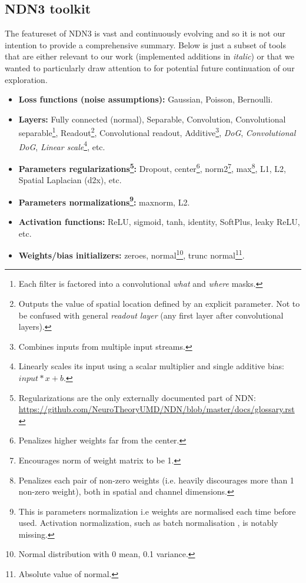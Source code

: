 \subsection{NDN3 toolkit}\label{ch:3.1.1}

The featureset of NDN3 is vast and continuously evolving and so it is not our intention to provide a comprehensive summary. Below is just a subset of tools that are either relevant to our work (implemented additions in \textit{italic}) or that we wanted to particularly draw attention to for potential future continuation of our exploration.

\begin{itemize}
    \item \textbf{Loss functions (noise assumptions):} Gaussian, Poisson, Bernoulli.
    
    \item \textbf{Layers:} Fully connected (normal), Separable, Convolution, Convolutional separable\footnote{Each filter is factored into a convolutional \textit{what} and \textit{where} masks.}, Readout\footnote{Outputs the value of spatial location defined by an explicit parameter. Not to be confused with general \textit{readout layer} (any first layer after convolutional layers).}, Convolutional readout, Additive\footnote{Combines inputs from multiple input streams.}, \textit{DoG}, \textit{Convolutional DoG}, \textit{Linear scale}\footnote{Linearly scales its input using a scalar multiplier and single additive bias: $input*x + b$.}, etc.
    
    \item \textbf{Parameters regularizations\footnote{Regularizations are the only externally documented part of NDN: \href{https://github.com/NeuroTheoryUMD/NDN/blob/master/docs/glossary.rst}{https://github.com{\-}/NeuroTheoryUMD/NDN/blob/master/docs/glossary.rst}}:} Dropout, center\footnote{Penalizes higher weights far from the center.}, norm2\footnote{Encourages norm of weight matrix to be 1.}, max\footnote{Penalizes each pair of non-zero weights (i.e. heavily discourages more than 1 non-zero weight), both in spatial and channel dimensions.}, L1, L2, Spatial Laplacian (d2x), etc.
    
    \item \textbf{Parameters normalizations\footnote{This is parameters normalization i.e weights are normalised each time before used. Activation normalization, such as batch normalisation \citep{2015arXiv150203167I}, is notably missing.}:} maxnorm, L2.
    
    \item \textbf{Activation functions:} ReLU, sigmoid, tanh, identity, SoftPlus, leaky ReLU, etc.
    
    \item \textbf{Weights/bias initializers:} zeroes, normal\footnote{Normal distribution with 0 mean, 0.1 variance.}, trunc normal\footnote{Absolute value of normal.}.
\end{itemize}

